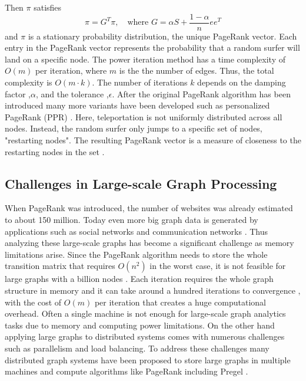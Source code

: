 Then $\pi$ satisfies 
\begin{equation}
    \pi=G^T\pi, \quad \text{where $G=\alpha S +\frac{1-\alpha}{n}ee^T$}
\end{equation}
and $\pi$ is a stationary probability distribution, the unique PageRank vector.
Each entry in the PageRank vector represents the probability that a random surfer will land on a specific node. The power iteration method has a time complexity of $O(m)$ per iteration, where $m$ is the the number of edges. Thus, the total complexity is $O(m\cdot k)$. The number of iterations $k$ depends on the damping factor ,$\alpha$, and the tolerance ,$\epsilon$. After the original PageRank algorithm has been introduced many more variants have been developed such as personalized PageRank (PPR) \cite{park_survey_2019}.
Here, teleportation is not uniformly distributed across all nodes. Instead, the random surfer only jumps to a specific set of nodes, "restarting nodes". The resulting PageRank vector is a measure of closeness to the restarting nodes in the set \cite{priyanta_social_2019}. 

 
\subsection{Challenges in Large-scale Graph Processing}
When PageRank was introduced, the number of websites was already estimated to about 150 million. Today even more big graph data is generated by applications such as social networks and communication networks \cite{gebreegziabher_chapter_2023}. Thus analyzing these large-scale graphs has become a significant challenge as memory limitations arise. Since the PageRank algorithm needs to store the whole transition matrix that requires $O(n^2)$ in the worst case, it is not feasible for large graphs with a billion nodes \cite{wu_efficient_2024}. Each iteration requires the whole graph structure in memory and it can take around a hundred iterations to convergence \cite{langville_googles_2012}, with the cost of $O(m)$ per iteration that creates a huge computational overhead. Often a single machine is not enough for large-scale graph analytics tasks due to memory and computing power limitations. On the other hand applying large graphs to distributed systems comes with numerous challenges such as parallelism and load balancing. To address these challenges many distributed graph systems have been proposed to store large graphs in multiple machines and compute algorithms like PageRank  including Pregel \cite{meng_survey_2024}.




